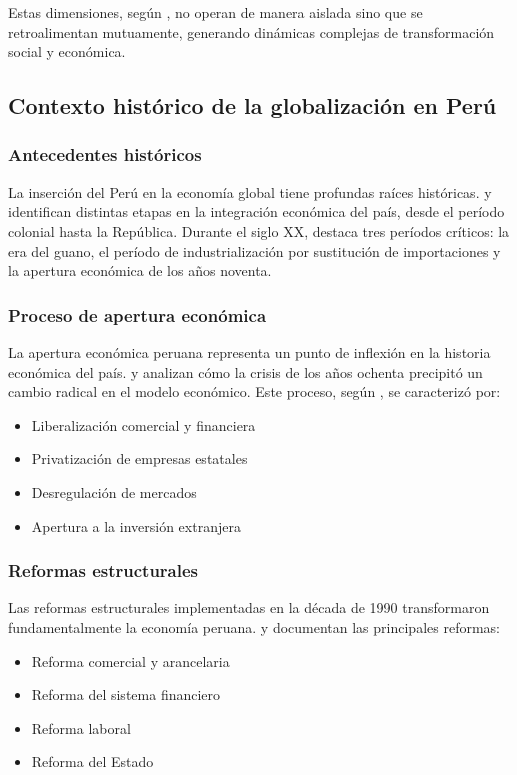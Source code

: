 \documentclass[12pt, a4paper]{article}
\begin{document}
Estas dimensiones, según \cite{giddens2013}, no operan de manera aislada sino que se retroalimentan mutuamente, generando dinámicas complejas de transformación social y económica.

\subsection{Contexto histórico de la globalización en Perú}

\subsubsection{Antecedentes históricos}
La inserción del Perú en la economía global tiene profundas raíces históricas. \cite{thorp2012} y \cite{bulmer1998} identifican distintas etapas en la integración económica del país, desde el período colonial hasta la República. Durante el siglo XX, \cite{sheahan2001} destaca tres períodos críticos: la era del guano, el período de industrialización por sustitución de importaciones y la apertura económica de los años noventa.

\subsubsection{Proceso de apertura económica}
La apertura económica peruana representa un punto de inflexión en la historia económica del país. \cite{wise2003} y \cite{pasco2009} analizan cómo la crisis de los años ochenta precipitó un cambio radical en el modelo económico. Este proceso, según \cite{gonzales2015}, se caracterizó por:
\begin{itemize}
    \item Liberalización comercial y financiera
    \item Privatización de empresas estatales
    \item Desregulación de mercados
    \item Apertura a la inversión extranjera
\end{itemize}

\subsubsection{Reformas estructurales}
Las reformas estructurales implementadas en la década de 1990 transformaron fundamentalmente la economía peruana. \cite{abusada2000} y \cite{parodi2014} documentan las principales reformas:
\begin{itemize}
    \item Reforma comercial y arancelaria
    \item Reforma del sistema financiero
    \item Reforma laboral
    \item Reforma del Estado
\end{itemize}
\end{document}

